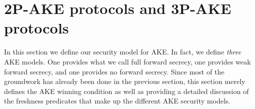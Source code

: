 


%	
%	
%	
%	

%








\section{2P-AKE protocols and 3P-AKE protocols}\label{sec:definitions:AKE}

In this section we define our security model for AKE.
In fact,
we define \emph{three} AKE models.
One provides what we call full forward secrecy,
one provides weak forward secrecy,
and one provides no forward secrecy.
Since most of the groundwork has already been done in the previous section,
this section merely defines the AKE winning condition as well as providing a detailed discussion of the freshness predicates that make up the different AKE security models.



